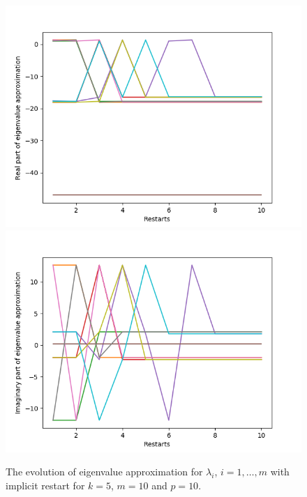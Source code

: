 \begin{figure}[h!]
\centering
\includegraphics[scale=0.4]{../task7/task7b1_k5m10p10.png}
\includegraphics[scale=0.4]{../task7/task7b2_k5m10p10.png}
\caption{The evolution of eigenvalue approximation for $\lambda_{i}$, $i = 1,\ldots,m$ with implicit restart for $k = 5$, $m=10$ and $p = 10$.}
\label{fig:task7b1k5}
\end{figure}


